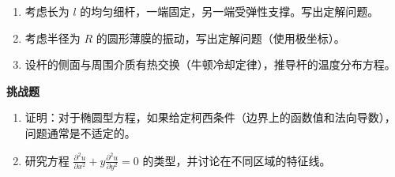 \begin{enumerate}[resume]
    \item 考虑长为 $l$ 的均匀细杆，一端固定，另一端受弹性支撑。写出定解问题。
    
    \item 考虑半径为 $R$ 的圆形薄膜的振动，写出定解问题（使用极坐标）。
    
    \item 设杆的侧面与周围介质有热交换（牛顿冷却定律），推导杆的温度分布方程。
\end{enumerate}

\textbf{挑战题}

\begin{enumerate}[resume]
    \item 证明：对于椭圆型方程，如果给定柯西条件（边界上的函数值和法向导数），问题通常是不适定的。
    
    \item 研究方程 $\frac{\partial^2 u}{\partial x^2} + y\frac{\partial^2 u}{\partial y^2} = 0$ 的类型，并讨论在不同区域的特征线。
\end{enumerate}
